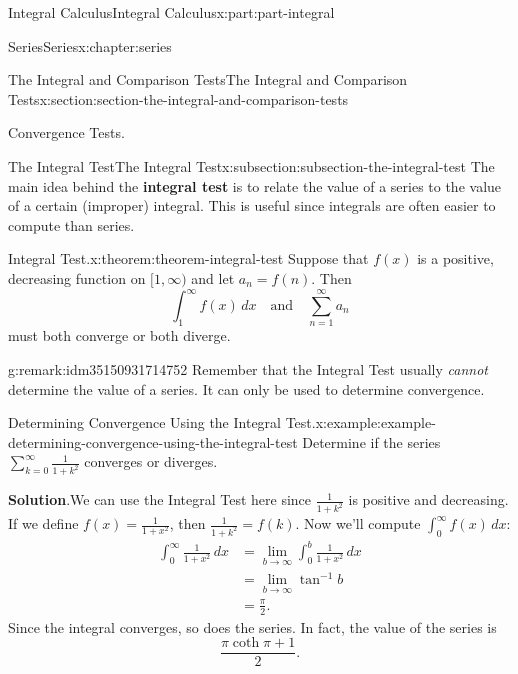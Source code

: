 \documentclass[twoside,10pt,]{tufte-book}
\newcommand{\blocktitlefont}{\relax}
\newcommand{\terminology}[1]{\textbf{#1}}
\numberwithin{equation}{part}
\newcommand{\amp}{&}
\begin{document}
\begin{partptx}{Integral Calculus}{}{Integral Calculus}{}{}{x:part:part-integral}
\begin{chapterptx}{Series}{}{Series}{}{}{x:chapter:series}
\begin{sectionptx}{The Integral and Comparison Tests}{}{The Integral and Comparison Tests}{}{}{x:section:section-the-integral-and-comparison-tests}
\begin{introduction}{Convergence Tests.}
\end{introduction}%
%
%
\typeout{************************************************}
\typeout{************************************************}
%
\begin{subsectionptx}{The Integral Test}{}{The Integral Test}{}{}{x:subsection:subsection-the-integral-test}
The main idea behind the \terminology{integral test} is to relate the value of a series to the value of a certain (improper) integral. This is useful since integrals are often easier to compute than series.%
\begin{theorem}{Integral Test.}{}{x:theorem:theorem-integral-test}%
Suppose that \(f(x)\) is a positive, decreasing function on \([1,\infty)\) and let \(a_{n} = f(n)\). Then%
\begin{equation*}
\int_{1}^{\infty}f(x)\,dx\quad\text{and}\quad \sum_{n=1}^{\infty}a_{n}
\end{equation*}
must both converge or both diverge.%
\end{theorem}
\begin{remark}{}{g:remark:idm35150931714752}%
Remember that the Integral Test usually \emph{cannot} determine the value of a series. It can only be used to determine convergence.%
\end{remark}
\begin{example}{Determining Convergence Using the Integral Test.}{x:example:example-determining-convergence-using-the-integral-test}%
Determine if the series \(\sum_{k=0}^{\infty}\frac{1}{1 + k^{2}}\) converges or diverges.%
\par\smallskip%
\noindent\textbf{\blocktitlefont Solution}.\hypertarget{g:solution:idm35150931712576}{}\quad{}We can use the Integral Test here since \(\frac{1}{1 + k^{2}}\) is positive and decreasing. If we define \(f(x) = \frac{1}{1 + x^{2}}\), then \(\frac{1}{1 + k^{2}} = f(k)\). Now we'll compute \(\int_{0}^{\infty}f(x)\,dx\):%
\begin{align*}
\int_{0}^{\infty}\frac{1}{1 + x^{2}}\,dx \amp = \lim_{b\to\infty}\int_{0}^{b}\frac{1}{1 + x^{2}}\,dx \\
\amp = \lim_{b\to\infty}\tan^{-1}b \\
\amp = \frac{\pi}{2} \text{.}
\end{align*}
Since the integral converges, so does the series. In fact, the value of the series is%
\begin{equation*}
\frac{\pi\coth\pi + 1}{2}\text{.}
\end{equation*}
%
\end{example}

\end{subsectionptx}
\end{sectionptx}
\end{chapterptx}
\end{partptx}
\end{document}
